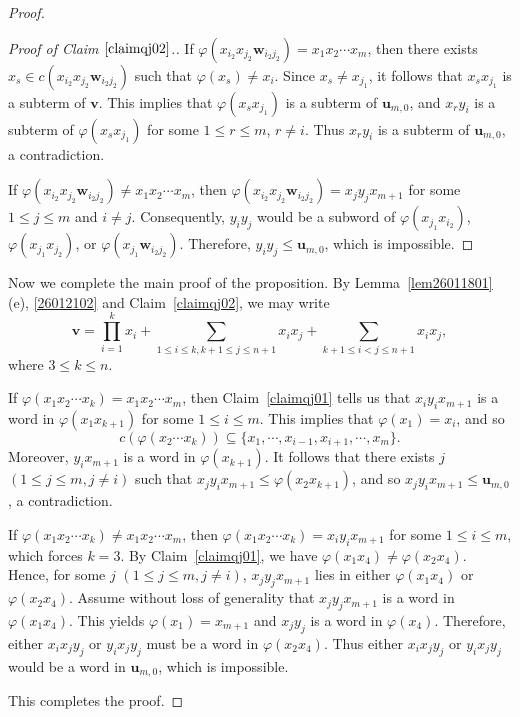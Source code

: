 \documentclass[reqno]{amsart}
\theoremstyle{plain}
\theoremstyle{definition}
\newcommand{\bu}{\mathbf{u}}
\newcommand{\bv}{\mathbf{v}}
\newcommand{\bw}{\mathbf{w}}
\begin{document}
\begin{proof}
\begin{proof}[Proof of Claim $\ref{claimqj02}$.]
If $\varphi(x_{i_2}x_{j_2}\bw_{i_2j_2})=x_1x_2\cdots x_m$,
then there exists $x_s\in c(x_{i_2}x_{j_2}\bw_{i_2j_2})$ such that $\varphi(x_s)\neq x_i$.
Since $x_s\neq x_{j_1}$, it follows that $x_sx_{j_1}$ is a subterm of $\bv$.
This implies that $\varphi(x_sx_{j_1})$ is a subterm of $\bu_{m,0}$,
and $x_ry_i$ is a subterm of $\varphi(x_sx_{j_1})$ for some $1\leq r\leq m$, $r\neq i$.
Thus $x_ry_i$ is a subterm of $\bu_{m,0}$, a contradiction.


If $\varphi(x_{i_2}x_{j_2}\bw_{i_2j_2})\neq x_1x_2\cdots x_m$, then $\varphi(x_{i_2}x_{j_2}\bw_{i_2j_2})=x_jy_jx_{m+1}$
for some $1\leq j\leq m$ and $i\neq j$.
Consequently, $y_iy_j$ would be a subword of $\varphi(x_{j_1}x_{i_2})$, $\varphi(x_{j_1}x_{j_2})$, or $\varphi(x_{j_1}\bw_{i_2j_2})$.
Therefore, $y_iy_j\leq \bu_{m, 0}$, which is impossible.
\end{proof}

Now we complete the main proof of the proposition.
By  Lemma~\ref{lem26011801}(e), \eqref{26012102} and Claim~\ref{claimqj02}, we may write
\[
\bv=\prod_{i=1}^k x_i+\sum_{1\leq i\leq k, k+1\leq j\leq n+1}x_ix_j+\sum_{k+1\leq i<j\leq n+1}x_ix_j,
\]
where $3\leq k\leq n$.

If $\varphi(x_1x_2\cdots x_k)=x_1x_2\cdots x_m$, then Claim~\ref{claimqj01} tells us that
$x_iy_ix_{m+1}$ is a word in $\varphi(x_1x_{k+1})$ for some $1\leq i\leq m$.
This implies that $\varphi(x_1)=x_i$, and so
\[
c(\varphi(x_2\cdots x_k))\subseteq\{x_1,\cdots, x_{i-1}, x_{i+1},\cdots, x_m\}.
\]
Moreover, $y_ix_{m+1}$ is a word in $\varphi(x_{k+1})$.
It follows that there exists $j$ $(1\leq j\leq m, j\neq i)$ such that
$x_jy_ix_{m+1}\leq\varphi(x_2x_{k+1})$, and so
$x_jy_ix_{m+1} \leq \bu_{m, 0}$, a contradiction.

If $\varphi(x_1x_2\cdots x_k)\neq x_1x_2\cdots x_m$,
then $\varphi(x_1x_2\cdots x_k)=x_iy_ix_{m+1}$ for some $1\leq i\leq m$, which forces $k=3$.
By Claim~\ref{claimqj01}, we have $\varphi(x_1x_4)\neq\varphi(x_2x_4)$.
Hence, for some $j$ $(1\leq j\leq m, j\neq i)$, $x_jy_jx_{m+1}$ lies in either $\varphi(x_1x_4)$ or $\varphi(x_2x_4)$.
Assume without loss of generality that $x_jy_jx_{m+1}$ is a word in $\varphi(x_1x_4)$.
This yields $\varphi(x_1)=x_{m+1}$ and $x_jy_j$ is a word in $\varphi(x_4)$.
Therefore, either $x_ix_jy_j$ or $y_ix_jy_j$ must be a word in $\varphi(x_2x_4)$.
Thus either $x_ix_jy_j$ or $y_ix_jy_j$ would be a word in $\bu_{m, 0}$, which is impossible.

This completes the proof.
\end{proof}
\end{document}
